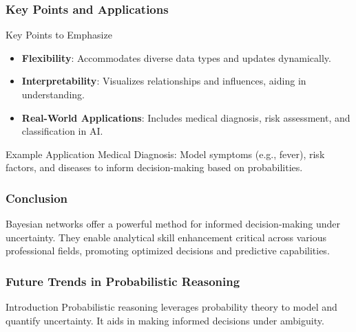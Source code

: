 \documentclass[aspectratio=169]{beamer}
\begin{document}
\begin{frame}[fragile]
    \frametitle{Key Points and Applications}
    \begin{block}{Key Points to Emphasize}
        \begin{itemize}
            \item \textbf{Flexibility}: Accommodates diverse data types and updates dynamically.
            \item \textbf{Interpretability}: Visualizes relationships and influences, aiding in understanding.
            \item \textbf{Real-World Applications}: Includes medical diagnosis, risk assessment, and classification in AI.
        \end{itemize}
    \end{block}

    \begin{block}{Example Application}
        Medical Diagnosis: Model symptoms (e.g., fever), risk factors, and diseases to inform decision-making based on probabilities.
    \end{block}
\end{frame}

\begin{frame}[fragile]
    \frametitle{Conclusion}
    Bayesian networks offer a powerful method for informed decision-making under uncertainty. They enable analytical skill enhancement critical across various professional fields, promoting optimized decisions and predictive capabilities.
\end{frame}

\begin{frame}[fragile]
    \frametitle{Future Trends in Probabilistic Reasoning}
    \begin{block}{Introduction}
        Probabilistic reasoning leverages probability theory to model and quantify uncertainty. It aids in making informed decisions under ambiguity.
    \end{block}
\end{frame}
\end{document}
